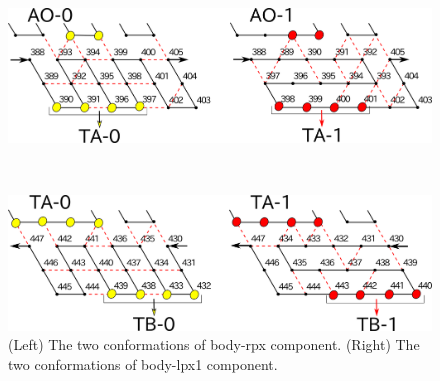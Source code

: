 \documentclass[dvipdfmx,runningheads]{llncs}
\begin{document}
\begin{figure}[h]
\centering
\begin{minipage}{0.45\linewidth}
\centering
\includegraphics[width=\linewidth]{pic/body-rpx1.png}
\end{minipage}
\begin{minipage}{0.05\linewidth}
\ \\
\end{minipage}
\begin{minipage}{0.45\linewidth}
\centering
\includegraphics[width=\linewidth]{pic/body-lpx1.png}
\end{minipage}
\caption{(Left) The two conformations of body-rpx component. 
(Right) The two conformations of body-lpx1 component.}
\label{fig:body-rpx}
\end{figure}
\end{document}
